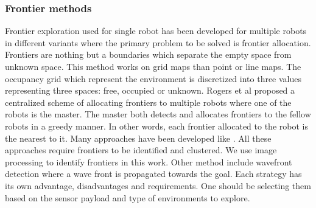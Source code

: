 \subsubsection{Frontier methods}
Frontier exploration used for single robot has been developed for multiple robots in different variants where the primary problem to be solved is frontier allocation. Frontiers are nothing but a boundaries which separate the empty space from unknown space. This method works on grid maps than point or line maps\cite{25}. The occupancy grid which represent the environment is discretized into three values representing three spaces: free, occupied or unknown\cite{17}. 
Rogers et al proposed a centralized scheme of allocating frontiers to multiple robots where one of the robots is the master. The master both detects and allocates frontiers to the fellow robots in a greedy manner. In other words, each frontier allocated to the robot is the nearest to it. Many approaches have been developed like \cite{46}\cite{47}. All these approaches require frontiers to be identified and clustered. We use image processing to identify frontiers in this work. Other method include wavefront detection where a wave front is propagated towards the goal. Each strategy has its own advantage, disadvantages and requirements. One should be selecting them based on the sensor payload and type of environments to explore.